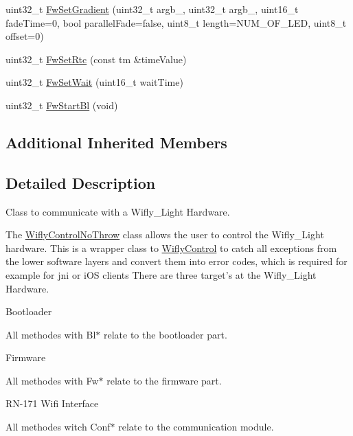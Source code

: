 \begin{DoxyCompactItemize}
\item 
uint32\-\_\-t \hyperlink{class_wifly_control_no_throw_aee4511965e53d1564da2788bebb271a1}{Fw\-Set\-Gradient} (uint32\-\_\-t argb\-\_, uint32\-\_\-t argb\-\_, uint16\-\_\-t fade\-Time=0, bool parallel\-Fade=false, uint8\-\_\-t length=N\-U\-M\-\_\-\-O\-F\-\_\-\-L\-E\-D, uint8\-\_\-t offset=0)
\item 
uint32\-\_\-t \hyperlink{class_wifly_control_no_throw_a5a8101329291df5f96c0312ad9975589}{Fw\-Set\-Rtc} (const tm \&time\-Value)
\item 
uint32\-\_\-t \hyperlink{class_wifly_control_no_throw_a311853b7e9eaffadc1e2664653b71534}{Fw\-Set\-Wait} (uint16\-\_\-t wait\-Time)
\item 
uint32\-\_\-t \hyperlink{class_wifly_control_no_throw_a026c989019eb328ffb2afb3e911399ce}{Fw\-Start\-Bl} (void)
\end{DoxyCompactItemize}
\subsection*{Additional Inherited Members}


\subsection{Detailed Description}
Class to communicate with a Wifly\-\_\-\-Light Hardware. 

The \hyperlink{class_wifly_control_no_throw}{Wifly\-Control\-No\-Throw} class allows the user to control the Wifly\-\_\-\-Light hardware. This is a wrapper class to \hyperlink{class_wifly_control}{Wifly\-Control} to catch all exceptions from the lower software layers and convert them into error codes, which is required for example for jni or i\-O\-S clients There are three target's at the Wifly\-\_\-\-Light Hardware.
\begin{DoxyItemize}
\item Bootloader\par
 All methodes with Bl$\ast$ relate to the bootloader part.
\item Firmware\par
 All methodes with Fw$\ast$ relate to the firmware part.
\item R\-N-\/171 Wifi Interface\par
 All methodes witch Conf$\ast$ relate to the communication module. 
\end{DoxyItemize}


